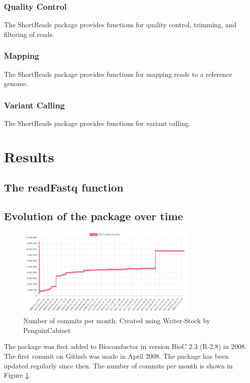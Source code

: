 \documentclass[12pt]{article}
\begin{document}
\subsubsection{Quality Control}
The ShortReads package provides functions for quality control, trimming, and filtering of reads.

\subsubsection{Mapping}
The ShortReads package provides functions for mapping reads to a reference genome.

\subsubsection{Variant Calling}
The ShortReads package provides functions for variant calling.

\section{Results}
\subsection{The readFastq function}


\subsection{Evolution of the package over time}
\begin{figure}[h]
    \includegraphics[width=0.8\textwidth]{figures/commits.png}
    \caption{Number of commits per month. Created using Writer-Stock %
    by PenguinCabinet}
    \label{fig:commits}
\end{figure}

The package was first added to Bioconductor in version BioC 2.3 (R-2.8) in 2008.
The first commit on Github was made in April 2008. The package has been updated regularly since then. The number of commits per month is shown in Figure \ref{fig:commits}.
\end{document}
